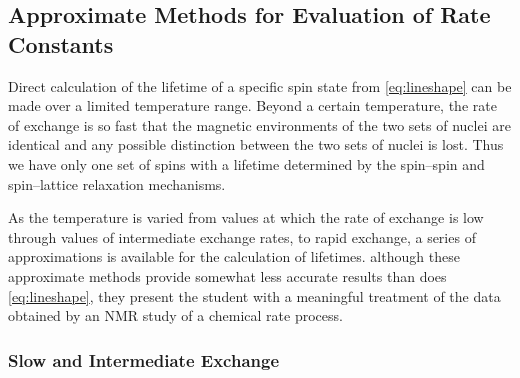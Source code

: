 \documentclass[nobib,nofonts,nols,nohyper]{tufte-handout}
\begin{document}

\subsection{Approximate Methods for Evaluation of Rate Constants\autocite{johnson65}} %
\label{sub:approximate_methods_for_evaluation_of_rate_constants_autocite_johnson66}

Direct calculation of the lifetime of a specific spin state from \cref{eq:lineshape} can be made over a limited temperature range.  
Beyond a certain temperature, the rate of exchange is so fast that the magnetic environments of the two sets of nuclei are identical and any possible distinction between the two sets of nuclei is lost. 
Thus we have only one set of spins with a lifetime determined by the spin--spin and spin--lattice relaxation mechanisms. 

As the temperature is varied from values at which the rate of exchange is low through values of intermediate exchange rates, to rapid exchange, a series of approximations is available for the calculation of lifetimes.
although these approximate methods provide somewhat less accurate results than does \cref{eq:lineshape}, they present the student with a meaningful treatment of the data obtained by an NMR study of a chemical rate process. 

\subsubsection{Slow and Intermediate Exchange} %
\label{ssub:slow_and_intermediate_exchange}
\end{document}
